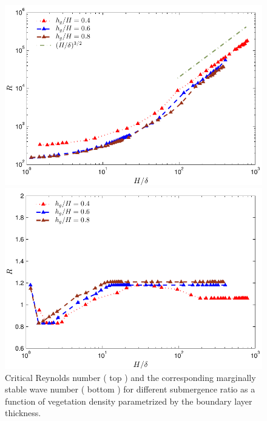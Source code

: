 \documentclass[12pt]{report}   %
\begin{document}
\begin{figure}
 \centerline{\includegraphics{IsotropicDragR_vs_delta}}
 \centerline{\includegraphics{IsotropicDragDeltaVsK}}
 \caption{
Critical Reynolds number ( top ) and the corresponding marginally stable wave number ( bottom ) for different submergence ratio as a function of vegetation density parametrized by the boundary layer thickness. }
\label{Symmetric_Re_vs_delta}
\end{figure}


%
\clearpage{\pagestyle{empty}\cleardoublepage}
\end{document}
